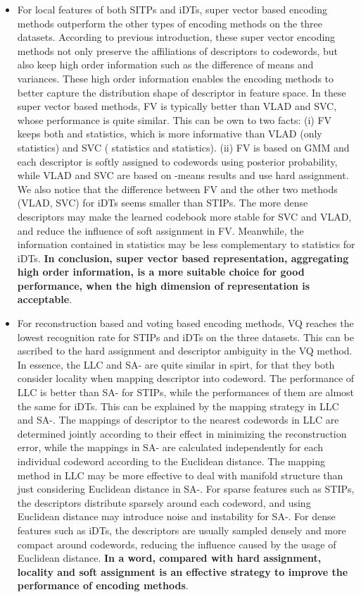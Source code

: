 \documentclass[twocolumn]{svjour3}          \smartqed  \usepackage{slashbox}
\begin{document}
\begin{itemize}
  \item For local features of both SITPs and iDTs, super vector based encoding methods outperform the other types of encoding methods on the three datasets. According to previous introduction, these super vector encoding methods not only preserve the affiliations of descriptors to codewords, but also keep high order information such as the difference of means and variances. These high order information enables the encoding methods to better capture the distribution shape of descriptor in feature space. In these super vector based methods, FV is typically better than VLAD and SVC, whose performance is quite similar. This can be own to two facts: (i) FV keeps both  and  statistics, which is more informative than VLAD (only  statistics) and SVC ( statistics and  statistics). (ii) FV is based on GMM and each descriptor is softly assigned to codewords using posterior probability, while VLAD and SVC are based on -means results and use hard assignment. We also notice that the difference between FV and the other two methods (VLAD, SVC) for iDTs seems smaller than STIPs. The more dense descriptors may make the learned codebook more stable for SVC and VLAD, and reduce the influence of soft assignment in FV. Meanwhile, the information contained in  statistics may be less complementary to  statistics for iDTs. \textbf{In conclusion, super vector based representation, aggregating high order information, is a more suitable choice for good performance, when the high dimension of representation is acceptable}.
  \item For reconstruction based and voting based encoding methods, VQ reaches the lowest recognition rate for STIPs and iDTs on the three datasets. This can be ascribed to the hard assignment and descriptor ambiguity in the VQ method. In essence, the LLC and SA- are quite similar in spirt, for that they both consider locality when mapping descriptor into codeword. The performance of LLC is better than SA- for STIPs, while the performances of them are almost the same for iDTs. This can be explained by the mapping strategy in LLC and SA-. The mappings of descriptor to the nearest codewords in LLC are determined jointly according to their effect in minimizing the reconstruction error, while the mappings in SA- are calculated independently for each individual codeword according to the Euclidean distance. The mapping method in LLC may be more effective to deal with manifold structure than just considering Euclidean distance in SA-. For sparse features such as STIPs, the descriptors distribute sparsely around each codeword, and using Euclidean distance may introduce noise and instability for SA-. For dense features such as iDTs, the descriptors are usually sampled densely and more compact around codewords, reducing the influence caused by the usage of Euclidean distance. \textbf{In a word, compared with hard assignment, locality and soft assignment is an effective strategy to improve the performance of encoding methods}.

\end{itemize}
\end{document}
